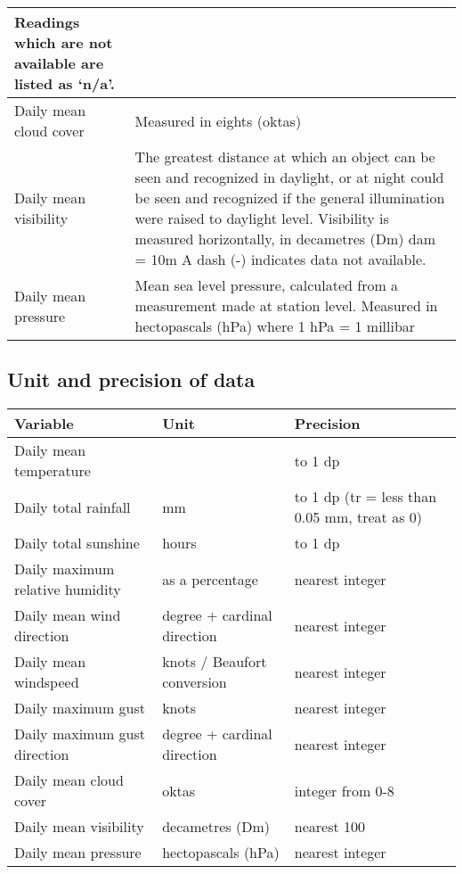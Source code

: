 \begin{tabular}{|p{5.5cm}|p{11.5cm}|}
	Readings which are not available are listed as ‘n/a’.  \\
	\hline
	Daily mean cloud cover & Measured in eights (oktas)   \\
	\hline
	Daily mean visibility & The greatest distance at which an object can be seen and recognized in daylight, or at night could be seen and recognized if the general illumination were raised to daylight level. 
	\newline Visibility is measured horizontally, in decametres (Dm) dam = 10m \newline A dash (-) indicates data not available.
	\\
	\hline
	Daily mean pressure & Mean sea level pressure, calculated from a measurement made at station level. \newline Measured in hectopascals (hPa) 	where 1 hPa = 1 millibar
	\\
	\hline
\end{tabular}
\subsection{Unit and precision of data}
\begin{tabular}{|l|l|l|}
	\hline
	\textbf{Variable} & \textbf{Unit} & \textbf{Precision}\\
	\hline
	Daily mean temperature & \textcelsius & to 1 dp\\
	\hline
	Daily total rainfall & mm & to 1 dp (tr = less than 0.05 mm, treat as 0)\\
	\hline
	Daily total sunshine & hours & to 1 dp \\
	\hline
	Daily maximum relative humidity & as a percentage & nearest integer \\
	\hline
	Daily mean wind direction & degree + cardinal direction & nearest integer  \\
	\hline
	Daily mean windspeed & knots / Beaufort conversion & nearest integer \\
	\hline
	Daily maximum gust & knots & nearest integer   \\
	\hline
	Daily maximum gust direction & degree + cardinal direction & nearest integer   \\
	\hline
	Daily mean cloud cover & oktas  & integer from 0-8   \\
	\hline
	Daily mean visibility & decametres (Dm) & nearest 100  \\
	\hline
	Daily mean pressure & hectopascals (hPa) & nearest integer  \\
	\hline
\end{tabular}

